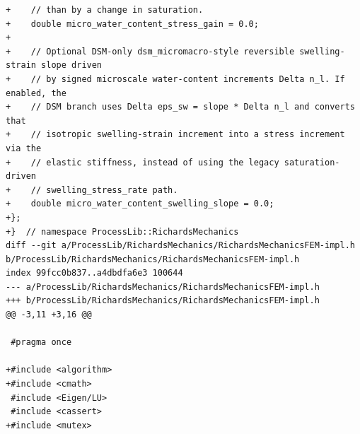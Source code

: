 \documentclass[10pt]{article}
\begin{document}
\begin{lstlisting}
+    // than by a change in saturation.
+    double micro_water_content_stress_gain = 0.0;
+
+    // Optional DSM-only dsm_micromacro-style reversible swelling-strain slope driven
+    // by signed microscale water-content increments Delta n_l. If enabled, the
+    // DSM branch uses Delta eps_sw = slope * Delta n_l and converts that
+    // isotropic swelling-strain increment into a stress increment via the
+    // elastic stiffness, instead of using the legacy saturation-driven
+    // swelling_stress_rate path.
+    double micro_water_content_swelling_slope = 0.0;
+};
+}  // namespace ProcessLib::RichardsMechanics
diff --git a/ProcessLib/RichardsMechanics/RichardsMechanicsFEM-impl.h b/ProcessLib/RichardsMechanics/RichardsMechanicsFEM-impl.h
index 99fcc0b837..a4dbdfa6e3 100644
--- a/ProcessLib/RichardsMechanics/RichardsMechanicsFEM-impl.h
+++ b/ProcessLib/RichardsMechanics/RichardsMechanicsFEM-impl.h
@@ -3,11 +3,16 @@
 
 #pragma once
 
+#include <algorithm>
+#include <cmath>
 #include <Eigen/LU>
 #include <cassert>
+#include <mutex>
 

\end{lstlisting}
\end{document}
